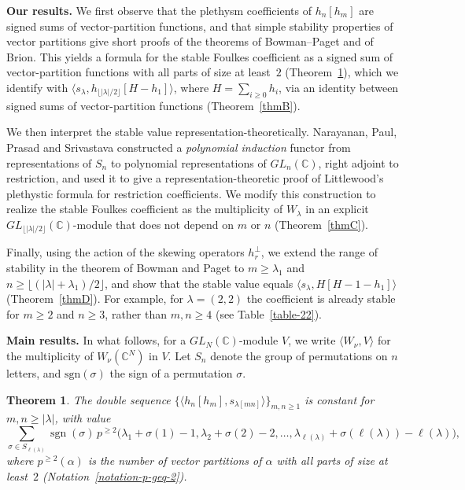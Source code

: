 \documentclass[reqno]{amsart}
\theoremstyle{plain}
\theoremstyle{definition}
\theoremstyle{remark}
\theoremstyle{plain}
\newtheorem{thmx}{Theorem}
\newcommand{\C}{\mathbb{C}}
\DeclareMathOperator{\sgn}{sgn}
\begin{document}
\medskip
\noindent\textbf{Our results.} We first observe that the plethysm
coefficients of $h_n[h_m]$ are signed sums of vector-partition functions, and
that simple stability properties of vector partitions give short proofs of
the theorems of Bowman--Paget and of Brion. This yields a formula for the
stable Foulkes coefficient as a signed sum of vector-partition functions with
all parts of size at least~$2$ (Theorem~\ref{thmA}), which we identify with
$\langle s_\lambda, h_{\lfloor|\lambda|/2\rfloor}[H-h_1]\rangle$, where
$H=\sum_{i\ge0}h_i$, via an identity between signed sums of vector-partition
functions (Theorem~\ref{thmB}).

We then interpret the stable value representation-theoretically. Narayanan,
Paul, Prasad and Srivastava \cite{narayanan} constructed a \emph{polynomial
induction} functor from representations of $S_n$ to polynomial
representations of $GL_n(\C)$, right adjoint to restriction, and used it to
give a representation-theoretic proof of Littlewood's plethystic formula for
restriction coefficients. We modify this construction to realize the stable
Foulkes coefficient as the multiplicity of $W_\lambda$ in an explicit
$GL_{\lfloor|\lambda|/2\rfloor}(\C)$-module that does not depend on $m$ or $n$
(Theorem~\ref{thmC}).

Finally, using the action of the skewing operators $h_r^\perp$, we extend the
range of stability in the theorem of Bowman and Paget to $m\ge\lambda_1$ and
$n\ge\lfloor(|\lambda|+\lambda_1)/2\rfloor$, and show that the stable value
equals $\langle s_\lambda, H[H-1-h_1]\rangle$ (Theorem~\ref{thmD}). For
example, for $\lambda=(2,2)$ the coefficient is already stable for $m\ge2$ and
$n\ge3$, rather than $m,n\ge4$ (see Table~\ref{table-22}).

\medskip
\noindent\textbf{Main results.} In what follows, for a $GL_N(\C)$-module $V$,
we write $\langle W_\nu, V\rangle$ for the multiplicity of $W_\nu(\C^N)$ in $V$. Let $S_n$ denote the group of permutations on $n$ letters, and $\mathrm{sgn}(\sigma)$ the sign of a permutation $\sigma$.

\begin{thmx}\label{thmA}
The double sequence $\{\langle h_n[h_m],s_{\lambda[mn]}\rangle\}_{m,n\ge1}$ is
constant for $m,n\geq |\lambda|$, with value
$$\sum_{\sigma\in S_{\ell(\lambda)}}\sgn(\sigma)\,
p^{\geq 2}\big(\lambda_1+\sigma(1)-1,\lambda_2+\sigma(2)-2,\dots,
\lambda_{\ell(\lambda)}+\sigma(\ell(\lambda))-\ell(\lambda)\big),$$
where $p^{\ge 2}(\alpha)$ is the number of vector partitions of $\alpha$ with
all parts of size at least~$2$ (Notation~\ref{notation-p-geq-2}).
\end{thmx}
\end{document}
